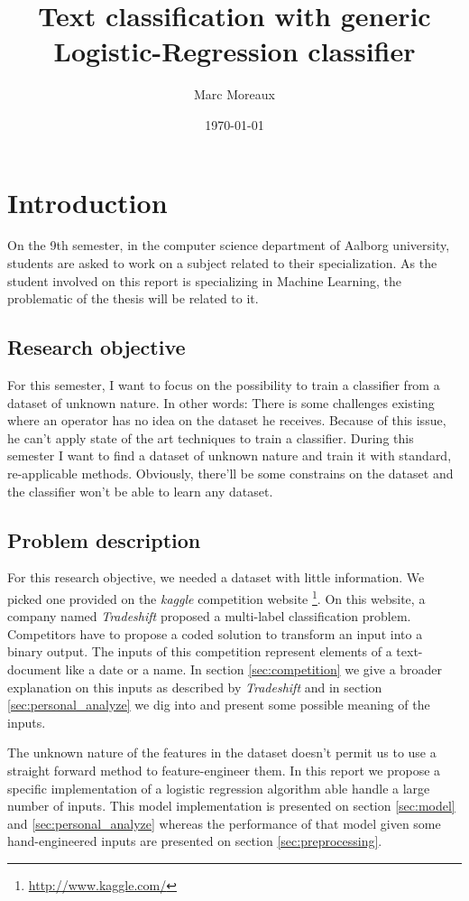 \documentclass[a4paper]{article}
\title{Text classification with generic Logistic-Regression classifier}
\author{Marc Moreaux}
\date{\today}
\begin{document}
\maketitle

% 


\section{Introduction}
	On the 9th semester, in the computer science department of Aalborg university, students are asked to work on a subject related to their specialization. As the student involved on this report is specializing in Machine Learning, the problematic of the thesis will be related to it.


	\subsection{Research objective}
		For this semester, I want to focus on the possibility to train a classifier from a dataset of unknown nature. In other words: There is some challenges existing where an operator has no idea on the dataset he receives. Because of this issue, he can't apply state of the art techniques to train a classifier. During this semester I want to find a dataset of unknown nature and train it with standard, re-applicable methods. Obviously, there'll be some constrains on the dataset and the classifier won't be able to learn any dataset.


	\subsection{Problem description}
		For this research objective, we needed a dataset with little information. We picked one provided on the \textit{kaggle} competition website \footnote{\url{http://www.kaggle.com/}}. On this website, a company named \textit{Tradeshift} proposed a multi-label classification problem. Competitors have to propose a coded solution to transform an input into a binary output. The inputs of this competition represent elements of a text-document like a date or a name. In section \ref{sec:competition} we give a broader explanation on this inputs as described by \textit{Tradeshift} and in section \ref{sec:personal_analyze} we dig into and present some possible meaning of the inputs.

		The unknown nature of the features in the dataset doesn't permit us to use a straight forward method to feature-engineer them. In this report we propose a specific implementation of a logistic regression algorithm able handle a large number of inputs. This model implementation is presented on section \ref{sec:model} and \ref{sec:personal_analyze} whereas the performance of that model given some hand-engineered inputs are presented on section \ref{sec:preprocessing}.
\end{document}
